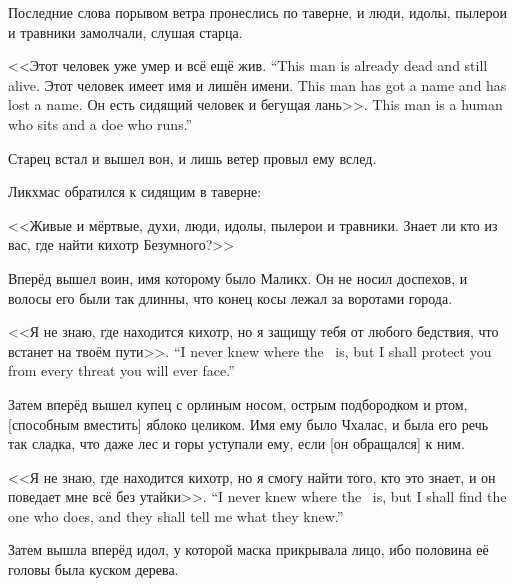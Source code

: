 Последние слова порывом ветра пронеслись по таверне, и люди, идолы, пылерои и травники замолчали, слушая старца.

{<<Этот человек уже умер и всё ещё жив.}
{``This man is already dead and still alive.}
{Этот человек имеет имя и лишён имени.}
{This man has got a name and has lost a name.}
{Он есть сидящий человек и бегущая лань>>.}
{This man is a human who sits and a doe who runs.''}

Старец встал и вышел вон, и лишь ветер провыл ему вслед.

Ликхмас обратился к сидящим в таверне:

<<Живые и мёртвые, духи, люди, идолы, пылерои и травники.
Знает ли кто из вас, где найти кихотр Безумного?>>

Вперёд вышел воин, имя которому было Маликх\FM.
Он не носил доспехов, и волосы его были так длинны, что конец косы лежал за воротами города\FM.

{<<Я не знаю, где находится кихотр, но я защищу тебя от любого бедствия, что встанет на твоём пути>>.}
{``I never knew where the \Kihotr\ is, but I shall protect you from every threat you will ever face.''}

Затем вперёд вышел купец с орлиным носом, острым подбородком и ртом, [способным вместить] яблоко целиком.
Имя ему было Чхалас, и была его речь так сладка, что даже лес и горы уступали ему, если [он обращался] к ним.

{<<Я не знаю, где находится кихотр, но я смогу найти того, кто это знает, и он поведает мне всё без утайки>>.}
{``I never knew where the \Kihotr\ is, but I shall find the one who does, and they shall tell me what they knew.''}

Затем вышла вперёд идол, у которой маска прикрывала лицо, ибо половина её головы была куском дерева\FM.


